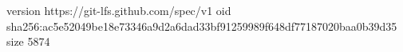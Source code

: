 version https://git-lfs.github.com/spec/v1
oid sha256:ac5e52049be18e73346a9d2a6dad33bf91259989f648df77187020baa0b39d35
size 5874
